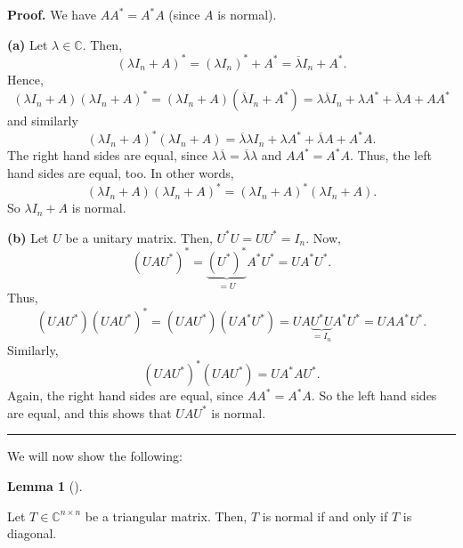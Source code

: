 \documentclass[numbers=enddot,12pt,final,onecolumn,notitlepage]{scrartcl}%
\numberwithin{exer}{subsection}
\theoremstyle{definition}
\newtheorem{lem}[theo]{Lemma}
\newenvironment{lemma}[1][]
{\begin{lem}[#1]\begin{leftbar}}
{\end{leftbar}\end{lem}}
\newenvironment{proof}[1][Proof]{\noindent\textbf{#1.} }{\ \rule{0.5em}{0.5em}}
\begin{document}
\begin{proof}
We have $AA^{\ast}=A^{\ast}A$ (since $A$ is normal).

\textbf{(a)} Let $\lambda\in\mathbb{C}$. Then,%
\[
\left(  \lambda I_{n}+A\right)  ^{\ast}=\left(  \lambda I_{n}\right)  ^{\ast
}+A^{\ast}=\overline{\lambda}I_{n}+A^{\ast}.
\]
Hence,%
\[
\left(  \lambda I_{n}+A\right)  \left(  \lambda I_{n}+A\right)  ^{\ast
}=\left(  \lambda I_{n}+A\right)  \left(  \overline{\lambda}I_{n}+A^{\ast
}\right)  =\lambda\overline{\lambda}I_{n}+\lambda A^{\ast}+\overline{\lambda
}A+AA^{\ast}%
\]
and similarly%
\[
\left(  \lambda I_{n}+A\right)  ^{\ast}\left(  \lambda I_{n}+A\right)
=\overline{\lambda}\lambda I_{n}+\lambda A^{\ast}+\overline{\lambda}A+A^{\ast
}A.
\]
The right hand sides are equal, since $\lambda\overline{\lambda}%
=\overline{\lambda}\lambda$ and $AA^{\ast}=A^{\ast}A$. Thus, the left hand
sides are equal, too. In other words,%
\[
\left(  \lambda I_{n}+A\right)  \left(  \lambda I_{n}+A\right)  ^{\ast
}=\left(  \lambda I_{n}+A\right)  ^{\ast}\left(  \lambda I_{n}+A\right)  .
\]
So $\lambda I_{n}+A$ is normal.

\textbf{(b)} Let $U$ be a unitary matrix. Then, $U^{\ast}U=UU^{\ast}=I_{n}$.
Now,%
\[
\left(  UAU^{\ast}\right)  ^{\ast}=\underbrace{\left(  U^{\ast}\right)
^{\ast}}_{=U}A^{\ast}U^{\ast}=UA^{\ast}U^{\ast}.
\]
Thus,%
\[
\left(  UAU^{\ast}\right)  \left(  UAU^{\ast}\right)  ^{\ast}=\left(
UAU^{\ast}\right)  \left(  UA^{\ast}U^{\ast}\right)  =UA\underbrace{U^{\ast}%
U}_{=I_{n}}A^{\ast}U^{\ast}=UAA^{\ast}U^{\ast}.
\]
Similarly,%
\[
\left(  UAU^{\ast}\right)  ^{\ast}\left(  UAU^{\ast}\right)  =UA^{\ast
}AU^{\ast}.
\]
Again, the right hand sides are equal, since $AA^{\ast}=A^{\ast}A$. So the
left hand sides are equal, and this shows that $UAU^{\ast}$ is normal.
\end{proof}

We will now show the following:

\begin{lemma}
Let $T\in\mathbb{C}^{n\times n}$ be a triangular matrix. Then, $T$ is normal
if and only if $T$ is diagonal.
\end{lemma}
\end{document}
